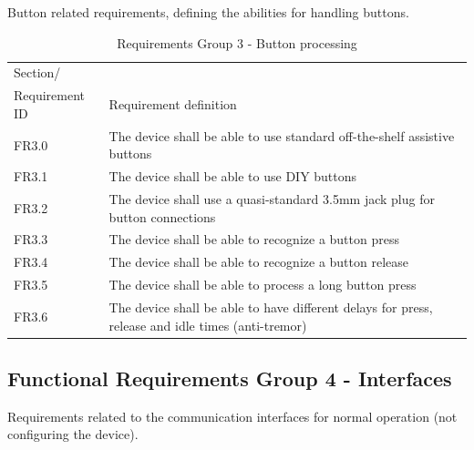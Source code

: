 \documentclass[]{scrreprt}%
\begin{document}
Button related requirements, defining the abilities for handling buttons.

\begin{table}[htb!]
 \centering
 \caption{Requirements Group 3 - Button processing}
\label{req_group3}
 \begin{tabularx}{\textwidth}{|l|X|} \hline
 Section/\\ Requirement ID & Requirement definition\\ \hline  \hline
 FR3.0 & The device shall be able to use standard off-the-shelf assistive buttons \\ \hline
 FR3.1 & The device shall be able to use DIY buttons \\ \hline
 FR3.2 & The device shall use a quasi-standard 3.5mm jack plug for button connections \\ \hline
 FR3.3 & The device shall be able to recognize a button press\\ \hline
 FR3.4 & The device shall be able to recognize a button release\\ \hline
 FR3.5 & The device shall be able to process a long button press\\ \hline
 FR3.6 & The device shall be able to have different delays for press, release and idle times (anti-tremor)\\ \hline
 \end{tabularx}
\end{table}
 

\subsection{Functional Requirements Group 4 - Interfaces}

Requirements related to the communication interfaces for normal operation (not configuring the device).
\end{document}
